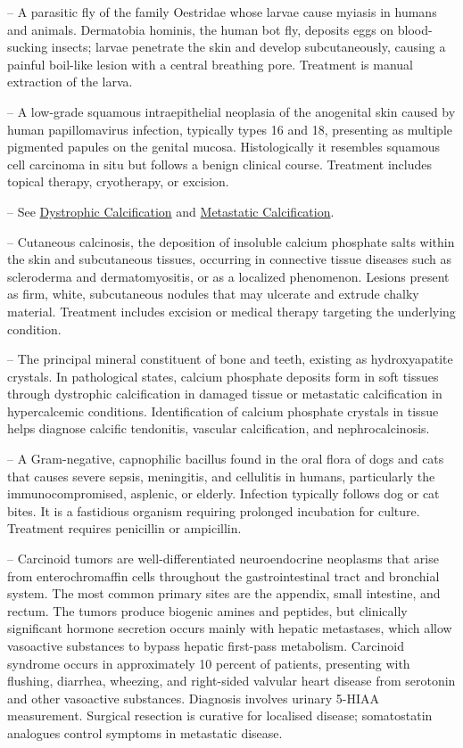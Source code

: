 -- A parasitic fly of the family Oestridae whose larvae cause myiasis in humans and animals. Dermatobia hominis, the human bot fly, deposits eggs on blood-sucking insects; larvae penetrate the skin and develop subcutaneously, causing a painful boil-like lesion with a central breathing pore. Treatment is manual extraction of the larva.

-- A low-grade squamous intraepithelial neoplasia of the anogenital skin caused by human papillomavirus infection, typically types 16 and 18, presenting as multiple pigmented papules on the genital mucosa. Histologically it resembles squamous cell carcinoma in situ but follows a benign clinical course. Treatment includes topical therapy, cryotherapy, or excision.

-- See \hyperlink{Dystrophic Calcification}{Dystrophic Calcification} and \hyperlink{Metastatic Calcification}{Metastatic Calcification}.

-- Cutaneous calcinosis, the deposition of insoluble calcium phosphate salts within the skin and subcutaneous tissues, occurring in connective tissue diseases such as scleroderma and dermatomyositis, or as a localized phenomenon. Lesions present as firm, white, subcutaneous nodules that may ulcerate and extrude chalky material. Treatment includes excision or medical therapy targeting the underlying condition.

-- The principal mineral constituent of bone and teeth, existing as hydroxyapatite crystals. In pathological states, calcium phosphate deposits form in soft tissues through dystrophic calcification in damaged tissue or metastatic calcification in hypercalcemic conditions. Identification of calcium phosphate crystals in tissue helps diagnose calcific tendonitis, vascular calcification, and nephrocalcinosis.

-- A Gram-negative, capnophilic bacillus found in the oral flora of dogs and cats that causes severe sepsis, meningitis, and cellulitis in humans, particularly the immunocompromised, asplenic, or elderly. Infection typically follows dog or cat bites. It is a fastidious organism requiring prolonged incubation for culture. Treatment requires penicillin or ampicillin.

-- Carcinoid tumors are well-differentiated neuroendocrine neoplasms that arise from enterochromaffin cells throughout the gastrointestinal tract and bronchial system. The most common primary sites are the appendix, small intestine, and rectum. The tumors produce biogenic amines and peptides, but clinically significant hormone secretion occurs mainly with hepatic metastases, which allow vasoactive substances to bypass hepatic first-pass metabolism. Carcinoid syndrome occurs in approximately 10 percent of patients, presenting with flushing, diarrhea, wheezing, and right-sided valvular heart disease from serotonin and other vasoactive substances. Diagnosis involves urinary 5-HIAA measurement. Surgical resection is curative for localised disease; somatostatin analogues control symptoms in metastatic disease.

